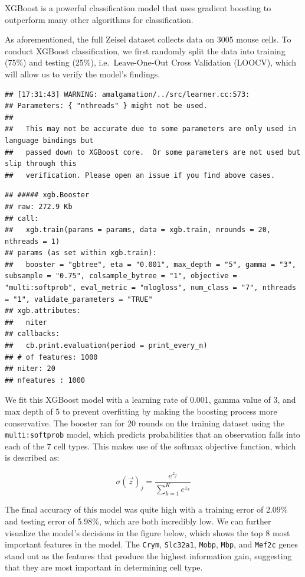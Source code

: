 \documentclass[]{article}
\begin{document}
XGBoost is a powerful classification model that uses gradient boosting
to outperform many other algorithms for classification.

As aforementioned, the full Zeisel dataset collects data on 3005 mouse
cells. To conduct XGBoost classification, we first randomly split the
data into training (75\%) and testing (25\%), i.e.~Leave-One-Out Cross
Validation (LOOCV), which will allow us to verify the model's findings.

\begin{verbatim}
## [17:31:43] WARNING: amalgamation/../src/learner.cc:573: 
## Parameters: { "nthreads" } might not be used.
## 
##   This may not be accurate due to some parameters are only used in language bindings but
##   passed down to XGBoost core.  Or some parameters are not used but slip through this
##   verification. Please open an issue if you find above cases.
\end{verbatim}

\begin{verbatim}
## ##### xgb.Booster
## raw: 272.9 Kb 
## call:
##   xgb.train(params = params, data = xgb.train, nrounds = 20, nthreads = 1)
## params (as set within xgb.train):
##   booster = "gbtree", eta = "0.001", max_depth = "5", gamma = "3", subsample = "0.75", colsample_bytree = "1", objective = "multi:softprob", eval_metric = "mlogloss", num_class = "7", nthreads = "1", validate_parameters = "TRUE"
## xgb.attributes:
##   niter
## callbacks:
##   cb.print.evaluation(period = print_every_n)
## # of features: 1000 
## niter: 20
## nfeatures : 1000
\end{verbatim}

We fit this XGBoost model with a learning rate of 0.001, gamma value of
3, and max depth of 5 to prevent overfitting by making the boosting
process more conservative. The booster ran for 20 rounds on the training
dataset using the \texttt{multi:softprob} model, which predicts
probabilities that an observation falls into each of the 7 cell types.
This makes use of the softmax objective function, which is described as:

\[\sigma(\overrightarrow{z})_j=\frac{e^{z_j}}{\sum_{k=1}^Ke^{z_k}}\]

The final accuracy of this model was quite high with a training error of
2.09\% and testing error of 5.98\%, which are both incredibly low. We
can further visualize the model's decisions in the figure below, which
shows the top 8 most important features in the model. The \texttt{Crym},
\texttt{Slc32a1}, \texttt{Mobp}, \texttt{Mbp}, and \texttt{Mef2c} genes
stand out as the features that produce the highest information gain,
suggesting that they are most important in determining cell type.
\end{document}

